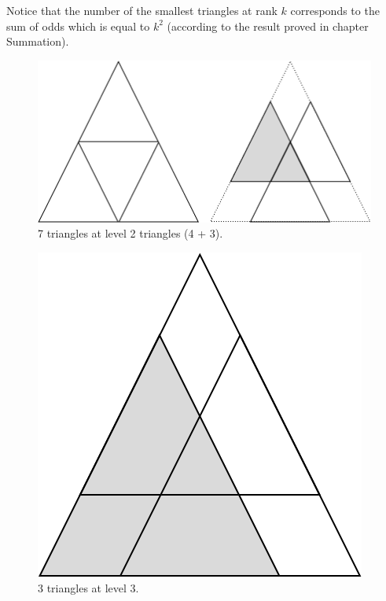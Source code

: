 \documentclass{article}[12pt]
\begin{document}
Notice that the number of the smallest triangles at rank $k$ corresponds to the sum of odds
which is equal to $k^2$ (according to the result proved in chapter Summation).
\begin{figure}[h]
\begin{center}
        \includegraphics[scale=0.3]{FiguresArithmetic/CountingTriangles2} 
        \caption{7 triangles at level 2 triangles (4 + 3).}
        \label{fig:countingTriangles2}
\end{center}
\end{figure}
\begin{figure}[h]
\begin{center}
        \includegraphics[scale=0.3]{FiguresArithmetic/CountingTriangles3} 
        \caption{3 triangles at level 3.}
        \label{fig:countingTriangles3}
\end{center}
\end{figure}
\bigskip
\end{document}
